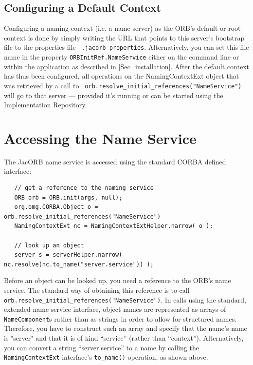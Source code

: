 \subsection*{Configuring a Default Context}

Configuring a naming context (i.e. a name server) as the ORB's default
or root context is done by  simply writing the URL that points to this
server's    bootstrap    file   to    the    properties   file    {\tt
.jacorb\_properties}.  Alternatively,  you can  set this file  name in
the property {\tt ORBInitRef.NameService} either on the command line or
within the application  as described in \ref{Sec_installation}.  After
the default  context has thus  been configured, all operations  on the
NamingContextExt  object  that  was   retrieved  by  a  call  to  {\tt
orb.resolve\_initial\_references("NameService")}   will  go   to  that
server  ---  provided  it's  running  or  can  be  started  using  the
Implementation Repository.

\section{Accessing the Name Service}

The  JacORB name  service is accessed using  the standard  CORBA
defined  interface:

\small{
\begin{verbatim}
   // get a reference to the naming service
   ORB orb = ORB.init(args, null);
   org.omg.CORBA.Object o = orb.resolve_initial_references("NameService")
   NamingContextExt nc = NamingContextExtHelper.narrow( o );

   // look up an object
   server s = serverHelper.narrow( nc.resolve(nc.to_name("server.service")) );
\end{verbatim}
}

Before an object  can be looked up, you need a  reference to the ORB's
name service. The standard way  of obtaining this reference is to call
{\tt orb.resolve\_initial\_\-referen\-ces("Name\-Service")}.  In calls using
the  standard,  extended  name  service interface,  object  names  are
represented as  arrays of {\tt NameComponent}s rather  than as strings
in  order to  allow  for  structured names.   Therefore,  you have  to
construct such an  array and specify that the  name's name is "server"
and    that    it    is    of   kind    ``service''    (rather    than
``context'').    Alternatively,    you    can   convert    a    string
``server.service''  to a  name by  calling the  {\tt NamingContextExt}
interface's {\tt to\_name()} operation, as shown above.

